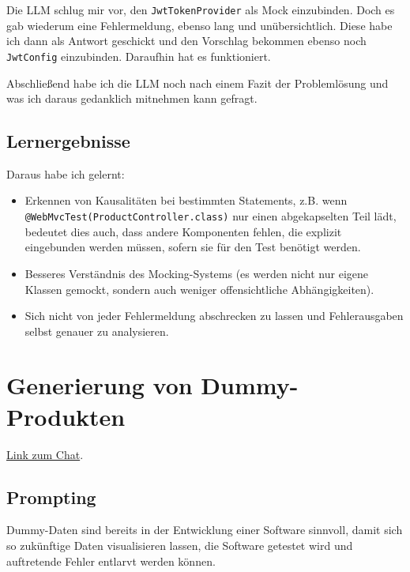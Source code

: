 \documentclass[12pt, a4paper]{scrreprt}
\begin{document}
	Die LLM schlug mir vor, den \texttt{JwtTokenProvider} als Mock einzubinden. Doch es gab wiederum eine Fehlermeldung, ebenso lang und unübersichtlich. Diese habe ich dann als Antwort geschickt und den Vorschlag bekommen ebenso noch \texttt{JwtConfig} einzubinden. Daraufhin hat es funktioniert. 
	
	Abschließend habe ich die LLM noch nach einem Fazit der Problemlösung und was ich daraus gedanklich mitnehmen kann gefragt.
		
	\subsection{Lernergebnisse}

	Daraus habe ich gelernt:
	
	\begin{itemize}
		\item Erkennen von Kausalitäten bei bestimmten Statements, \linebreak z.B. wenn
		\texttt{@WebMvcTest(ProductController.}\texttt{class)} nur einen abgekapselten Teil
		lädt, bedeutet dies auch, dass andere Komponenten fehlen, die explizit
		eingebunden werden müssen, sofern sie für den Test benötigt werden.
	
		\item Besseres Verständnis des Mocking-Systems (es werden nicht nur
		eigene Klassen gemockt, sondern auch weniger offensichtliche Abhängigkeiten).
	
		\item Sich nicht von jeder Fehlermeldung abschrecken zu lassen und
		Fehlerausgaben selbst genauer zu analysieren.
	\end{itemize}
	
	\section{Generierung von Dummy-Produkten}
	
	\href{https://gemini.google.com/share/154e58452bd1}{Link zum Chat}.
	
	\subsection{Prompting}

	Dummy-Daten sind bereits in der Entwicklung einer Software sinnvoll, damit sich so zukünftige Daten visualisieren lassen, die Software getestet wird und auftretende Fehler entlarvt werden können.
	
\end{document}
